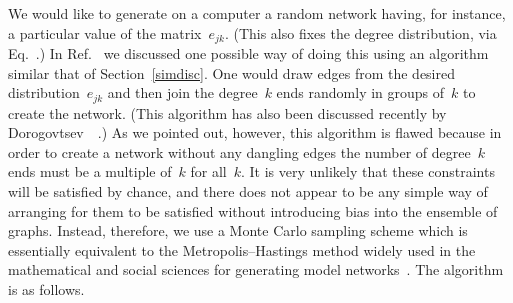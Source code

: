 \documentclass[twocolumn,pre]{revtex4}
\begin{document}
We would like to generate on a computer a random network having, for
instance, a particular value of the matrix~$e_{jk}$.  (This also fixes the
degree distribution, via Eq.~.)  In
Ref.~ we discussed one possible way of doing this
using an algorithm similar that of Section~\ref{simdisc}.  One would draw
edges from the desired distribution~$e_{jk}$ and then join the degree~$k$
ends randomly in groups of~$k$ to create the network.  (This algorithm has
also been discussed recently by Dorogovtsev~\etal~\cite{DMS02}.)  As we
pointed out, however, this algorithm is flawed because in order to create a
network without any dangling edges the number of degree~$k$ ends must be a
multiple of~$k$ for all~$k$.  It is very unlikely that these constraints
will be satisfied by chance, and there does not appear to be any simple way
of arranging for them to be satisfied without introducing bias into the
ensemble of graphs.  Instead, therefore, we use a Monte Carlo sampling
scheme which is essentially equivalent to the Metropolis--Hastings method
widely used in the mathematical and social sciences for generating model
networks~\cite{Strauss86,Snijders02}.  The algorithm is as follows.
\end{document}
